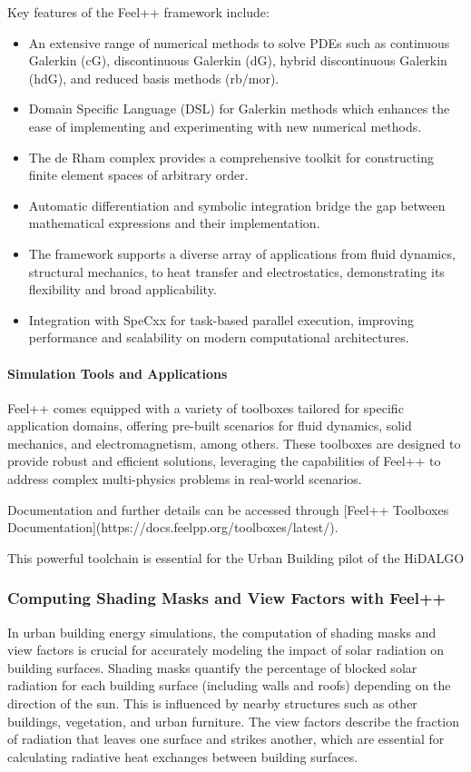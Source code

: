 \documentclass[runningheads]{llncs}
\begin{document}
Key features of the Feel++ framework include:
\begin{itemize}
    \item An extensive range of numerical methods to solve PDEs such as continuous Galerkin (cG), discontinuous Galerkin (dG), hybrid discontinuous Galerkin (hdG), and reduced basis methods (rb/mor).
    \item Domain Specific Language (DSL) for Galerkin methods which enhances the ease of implementing and experimenting with new numerical methods.
    \item The de Rham complex provides a comprehensive toolkit for constructing finite element spaces of arbitrary order.
    \item Automatic differentiation and symbolic integration bridge the gap between mathematical expressions and their implementation.
    \item The framework supports a diverse array of applications from fluid dynamics, structural mechanics, to heat transfer and electrostatics, demonstrating its flexibility and broad applicability.
    \item Integration with SpeCxx for task-based parallel execution, improving performance and scalability on modern computational architectures.
\end{itemize}

\paragraph{Simulation Tools and Applications}
Feel++ comes equipped with a variety of toolboxes tailored for specific application domains, offering pre-built scenarios for fluid dynamics, solid mechanics, and electromagnetism, among others. These toolboxes are designed to provide robust and efficient solutions, leveraging the capabilities of Feel++ to address complex multi-physics problems in real-world scenarios.

Documentation and further details can be accessed through [Feel++ Toolboxes Documentation](https://docs.feelpp.org/toolboxes/latest/).

This powerful toolchain is essential for the Urban Building pilot of the HiDALGO

\subsubsection{Computing Shading Masks and View Factors with Feel++}

In urban building energy simulations, the computation of shading masks and view factors is crucial for accurately modeling the impact of solar radiation on building surfaces. Shading masks quantify the percentage of blocked solar radiation for each building surface (including walls and roofs) depending on the direction of the sun. This is influenced by nearby structures such as other buildings, vegetation, and urban furniture. The view factors describe the fraction of radiation that leaves one surface and strikes another, which are essential for calculating radiative heat exchanges between building surfaces.
\end{document}
